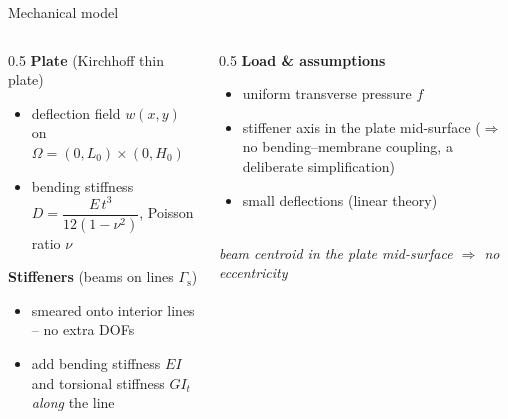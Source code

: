 \documentclass[10pt,c,intlimits,aspectratio=1610]{beamer}
\newcommand{\Om}{\Omega}
\newcommand{\Gs}{\Gamma_{\mathrm s}}
\newcommand{\highlight}[1]{{\color{dpRed}#1}}
\begin{document}
\begin{frame}{Mechanical model}
  \begin{columns}[t]
    \begin{column}{0.5\textwidth}
      \textbf{Plate} (Kirchhoff thin plate)
      \begin{itemize}
        \item deflection field $w(x,y)$ on $\Om=(0,L_0)\times(0,H_0)$
        \item bending stiffness $D=\dfrac{E\,t^3}{12(1-\nu^2)}$,\; Poisson ratio $\nu$
      \end{itemize}
      \vspace{1mm}
      \textbf{Stiffeners} (beams on lines $\Gs$)
      \begin{itemize}
        \item smeared onto interior lines -- \highlight{no extra DOFs}
        \item add bending stiffness $EI$ and torsional stiffness $GI_t$
              \emph{along} the line
      \end{itemize}
    \end{column}
    \begin{column}{0.5\textwidth}
      \textbf{Load \& assumptions}
      \begin{itemize}
        \item uniform transverse pressure $f$
        \item stiffener axis in the plate mid-surface
              ($\Rightarrow$ no bending--membrane coupling, a deliberate
              simplification)
        \item small deflections (linear theory)
      \end{itemize}
      \vspace{1mm}
      \centering
      \\[0.5mm]
      {\scriptsize\itshape beam centroid in the plate mid-surface
        $\Rightarrow$ no eccentricity}
    \end{column}
  \end{columns}
\end{frame}
\end{document}
